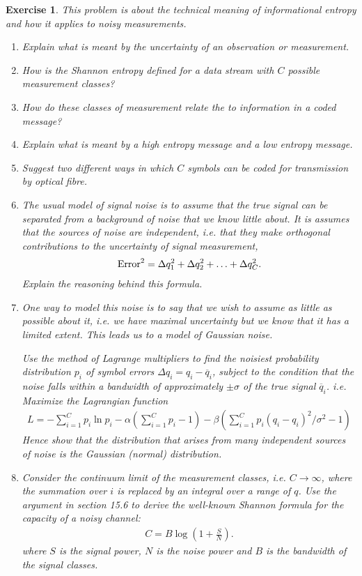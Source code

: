 \documentclass{book}
\newtheorem{exercise}{Exercise}
\def\beq{\begin{eqnarray}}
\def\eeq{\end{eqnarray}}
\begin{document}
\begin{exercise}
This problem is about the technical meaning of informational entropy and how it
applies to noisy measurements.
\begin{enumerate}
\item Explain what is meant by the uncertainty of an observation or measurement.
\item How is the Shannon entropy defined for a data stream with $C$ possible measurement classes?
\item How do these classes of measurement relate the to information in a coded message?

\item Explain what is meant by a high entropy message and a low entropy message.

\item Suggest two different ways in which $C$ symbols can be coded for transmission
by optical fibre.

\item The usual model of signal noise is to assume that the true signal can be separated
from a background of noise that we know little about. It is assumes that the
sources of noise are independent, i.e. that they make orthogonal contributions to the
uncertainty of signal measurement,
\beq
{\rm Error}^2 = \Delta q_1^2 + \Delta q_2^2 + \ldots + \Delta q_C^2.
\eeq
Explain the reasoning behind this formula.

\item One way to model this noise is to say that we wish to assume as little as
possible about it, i.e. we have maximal uncertainty but we know that it has
a limited extent. This leads us to a model of Gaussian noise.

Use the method of Lagrange multipliers to find the noisiest
probability distribution $p_i$ of symbol errors $\Delta q_i = q_i -
\overline q_i$, subject to the condition that the noise falls within a
bandwidth of approximately $\pm\sigma$ of the true signal $\overline
q_i$. i.e.  Maximize the Lagrangian function
\beq
L = -\sum_{i=1}^C p_i\ln p_i - \alpha\left(\sum_{i=1}^C p_i -1\right)
-\beta \left(\sum_{i=1}^C p_i (q_i - q_i)^2/\sigma^2 -1\right)
\eeq
Hence show that the distribution that arises from many independent sources of noise
is the Gaussian (normal) distribution.

\item Consider the continuum limit of the measurement classes, i.e. $C\rightarrow \infty$,
where the summation over $i$ is replaced by an integral over a range of $q$.
Use the argument in section 15.6 to derive the well-known Shannon formula for the capacity
of a noisy channel:
\beq
C = B \log \left(1+\frac{S}{N}\right).
\eeq
where $S$ is the signal power, $N$ is the noise power and $B$ is the bandwidth of
the signal classes.
\end{enumerate}
\end{exercise}
\begin{solution}
\end{solution}
\end{document}
